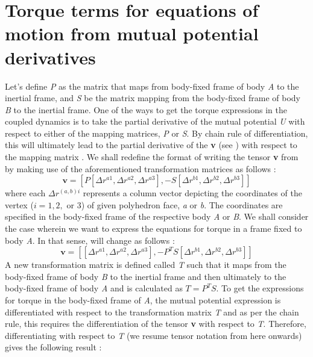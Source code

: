 \section{Torque terms for equations of motion from mutual potential derivatives}
\label{torque_terms}
Let's define \textit{P} as the matrix that maps from body-fixed frame of body \textit{A} to the inertial frame, and \textit{S} be the matrix mapping from the body-fixed frame of body \textit{B} to the inertial frame. One of the ways to get the torque expressions in the coupled dynamics is to take the partial derivative of the mutual potential \textit{U} with respect to either of the mapping matrices, \textit{P} or \textit{S}. By chain rule of differentiation, this will ultimately lead to the partial derivative of the \textbf{v} (see ) with respect to the mapping matrix \cite{fahn_poly}. We shall redefine the format of writing the tensor \textbf{v} from  by making use of the aforementioned transformation matrices as follows \cite{fahn_poly}:
\begin{equation}
\label{v_ten}
\mathbf{v} =[P[\Delta r^{a1}, \Delta r^{a2}, \Delta r^{a3}], -S[\Delta r^{b1}, \Delta r^{b2}, \Delta r^{b3}]]
\end{equation}
%
where each $\Delta r^{(a,b)i}$ represents a column vector depicting the coordinates of the vertex ($i = 1,2, \text{ or } 3$) of given polyhedron face, \textit{a} or \textit{b}. The coordinates are specified in the body-fixed frame of the respective body \textit{A} or \textit{B}. We shall consider the case wherein we want to express the equations for torque in a frame fixed to body \textit{A}. In that sense,  will change as follows \cite{fahn_poly}:
\begin{equation}
\label{v_tens2}
\mathbf{v} =[[\Delta r^{a1}, \Delta r^{a2}, \Delta r^{a3}], -P^T S[\Delta r^{b1}, \Delta r^{b2}, \Delta r^{b3}]]
\end{equation}
%
A new transformation matrix is defined called \textit{T} such that it maps from the body-fixed frame of body \textit{B} to the inertial frame and then ultimately to the body-fixed frame of body \textit{A} and is calculated as $T = P^T S$. To get the expressions for torque in the body-fixed frame of \textit{A}, the mutual potential expression is differentiated with respect to the transformation matrix \textit{T} and as per the chain rule, this requires the differentiation of the tensor \textbf{v} with respect to \textit{T}. Therefore, differentiating  with respect to \textit{T} (we resume tensor notation from here onwards) gives the following result \cite{fahn_poly}:
